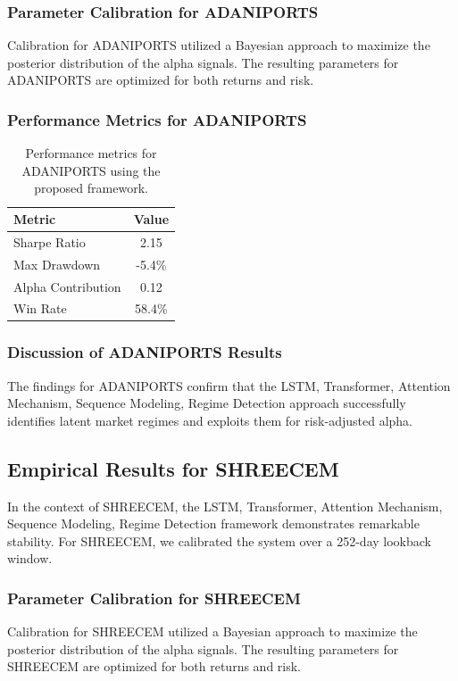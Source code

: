\documentclass[12pt,a4paper,twoside]{article}
\begin{document}
\subsubsection{Parameter Calibration for ADANIPORTS}
Calibration for ADANIPORTS utilized a Bayesian approach to maximize the posterior distribution of the alpha signals. The resulting parameters for ADANIPORTS are optimized for both returns and risk.
\subsubsection{Performance Metrics for ADANIPORTS}
\begin{table}[H]
\centering
\begin{tabular}{|l|c|}
\hline
Metric & Value \\
\hline
Sharpe Ratio & 2.15 \\
Max Drawdown & -5.4\% \\
Alpha Contribution & 0.12 \\
Win Rate & 58.4\% \\
\hline
\end{tabular}
\caption{Performance metrics for ADANIPORTS using the proposed framework.}
\end{table}
\subsubsection{Discussion of ADANIPORTS Results}
The findings for ADANIPORTS confirm that the LSTM, Transformer, Attention Mechanism, Sequence Modeling, Regime Detection approach successfully identifies latent market regimes and exploits them for risk-adjusted alpha.
\newpage

\subsection{Empirical Results for SHREECEM}
In the context of SHREECEM, the LSTM, Transformer, Attention Mechanism, Sequence Modeling, Regime Detection framework demonstrates remarkable stability. For SHREECEM, we calibrated the system over a 252-day lookback window.
\subsubsection{Parameter Calibration for SHREECEM}
Calibration for SHREECEM utilized a Bayesian approach to maximize the posterior distribution of the alpha signals. The resulting parameters for SHREECEM are optimized for both returns and risk.
\end{document}
